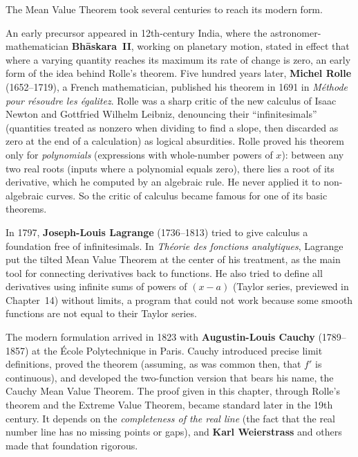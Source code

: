 \begin{historybox}
The Mean Value Theorem took several centuries to reach its modern form.

An early precursor appeared in 12th-century India, where the astronomer-mathematician
\textbf{Bh\=askara~II}, working on planetary motion, stated in effect that where a
varying quantity reaches its maximum its rate of change is zero, an early form of
the idea behind Rolle's theorem. Five
hundred years later, \textbf{Michel Rolle} (1652--1719), a French
mathematician, published his theorem in 1691 in \emph{M\'ethode pour r\'esoudre les
\'egalitez}. Rolle was a sharp critic of the new calculus of Isaac Newton and
Gottfried Wilhelm Leibniz, denouncing their ``infinitesimals'' (quantities treated as
nonzero when dividing to find a slope, then discarded as zero at the end of a
calculation) as logical absurdities. Rolle proved his theorem only for
\emph{polynomials} (expressions with whole-number powers of $x$): between any two real
roots (inputs where a polynomial equals zero), there lies a root of its
derivative, which he computed by an algebraic rule. He never applied it to
non-algebraic curves. So the critic of calculus became famous for one of its basic
theorems.

In 1797, \textbf{Joseph-Louis Lagrange} (1736--1813) tried to give calculus a
foundation free of infinitesimals. In \emph{Th\'eorie des
fonctions analytiques}, Lagrange put the tilted Mean Value Theorem at the
center of his treatment, as the main tool for connecting
derivatives back to functions. He also tried to define all derivatives using
infinite sums of powers of $(x-a)$ (Taylor series, previewed in
Chapter~14) without limits, a program that could not work because some
smooth functions are not equal to their Taylor series.

The modern formulation arrived in 1823 with \textbf{Augustin-Louis Cauchy}
(1789--1857) at the \'Ecole Polytechnique in Paris. Cauchy introduced precise limit
definitions, proved the theorem (assuming, as was common then, that $f'$ is
continuous), and developed the two-function version that bears his name, the Cauchy
Mean Value Theorem. The proof given in this chapter, through Rolle's theorem and the
Extreme Value Theorem, became standard later in the 19th century. It depends on the
\emph{completeness of the real line} (the fact that the real number line has no
missing points or gaps), and \textbf{Karl Weierstrass} and others made that
foundation rigorous.


\end{historybox}

